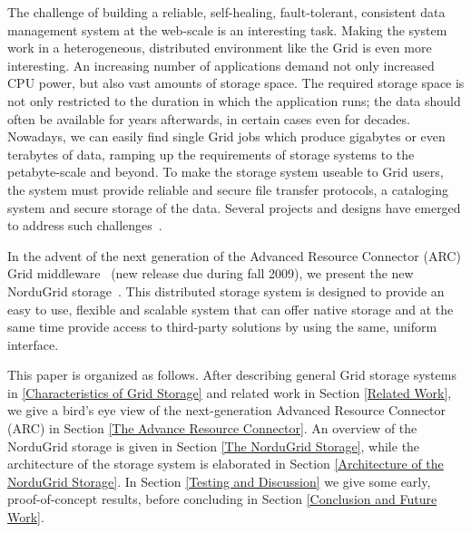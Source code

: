 \documentclass{llncs}
\begin{document}
The challenge of building a reliable, self-healing, fault-tolerant,
consistent data management system at the web-scale is an interesting
task. Making the system work in a heterogeneous, distributed
environment like the Grid is even more interesting. An increasing
number of applications demand not only increased CPU power, but also
vast amounts of storage space. The required storage space is not only
restricted to the duration in which the application runs; the data
should often be available for years afterwards, in certain cases even
for decades. Nowadays, we can easily find single Grid jobs which produce
gigabytes or even terabytes of data, ramping up the requirements of
storage systems to the petabyte-scale and beyond.
To make the storage system useable to Grid users, the system must provide
reliable and secure file transfer protocols, a cataloging system and
secure storage of the data. Several projects and designs have emerged
to address such challenges~\cite{Hoschek00datamanagement,DengWang}.

In the advent of the next generation of the Advanced Resource
Connector (ARC) Grid middleware~\cite{arc} (new release due during
fall 2009), we present the new NorduGrid storage~\cite{ARCStoragedesigndoc}. This distributed storage system is
designed to provide an easy to use, flexible and scalable system that
can offer native storage and at the same time provide access to
third-party solutions
by using the same, uniform interface. 




This paper is organized as follows. After describing
general Grid storage systems in \ref{Characteristics of Grid Storage}
and related work in Section \ref{Related Work}, we give a bird's eye
view of the next-generation Advanced Resource Connector (ARC) in
Section \ref{The Advance Resource Connector}. An overview of the NorduGrid storage is given in Section \ref{The NorduGrid Storage}, while
the architecture of the storage system is elaborated in Section
\ref{Architecture of the NorduGrid Storage}. In Section \ref{Testing and
  Discussion} we give some early, proof-of-concept results, before 
concluding in Section \ref{Conclusion and Future Work}. 
\end{document}
